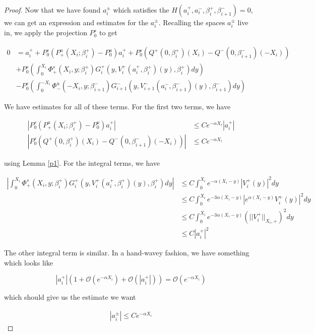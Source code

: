 \documentclass[thesis.tex]{subfiles}
\begin{document}
\begin{lemma}
\begin{proof}
Now that we have found $a_i^\pm$ which satisfies the $H(a_i^+, a_i^-, \beta_i^+, \beta_{i+1}^-) = 0$, we can get an expression and estimates for the $a_i^\pm$. Recalling the spaces $a_i^\pm$ live in, we apply the projection $P^s_0$ to get

\begin{align*}
0 &= a_i^+ + P^s_0(P^u_+(X_i; \beta_i^+) -  P^u_0)a_i^+ 
+ P^s_0 \left( Q^+(0, \beta_i^+)(X_i) - Q^-(0, \beta_{i+1}^-)(-X_i) \right)\\
&+ P^s_0 \left( \int_0^{X_i} \Phi_+^s(X_i, y; \beta_i^+) G_i^+(y, V_i^+(a_i^+, \beta_i^+)(y),\beta_i^+)dy \right) \\
&- P^s_0 \left( \int_0^{-X_i} \Phi_-^u(-X_i, y; \beta_{i+1}^-) G_{i+1}^-(y, V_{i+1}^-(a_i^-, \beta_{i+1}^-)(y),\beta_{i+1}^-) dy \right)
\end{align*}

We have estimates for all of these terms. For the first two terms, we have

\begin{align*}
|P^s_0(P^u_+(X_i; \beta_i^+) -  P^u_0)a_i^+ | &\leq C e^{-\alpha X_i} |a_i^+| \\
|P^s_0 \left( Q^+(0, \beta_i^+)(X_i) - Q^-(0, \beta_{i+1}^-)(-X_i) \right)| &\leq C e^{-\alpha X_i}
\end{align*}

using Lemma \ref{p1}. For the integral terms, we have

\begin{align*}
\left| \int_0^{X_i} \Phi_+^s(X_i, y; \beta_i^+) G_i^+(y, V_i^+(a_i^+, \beta_i^+)(y),\beta_i^+)dy \right| &\leq C \int_0^{X_i}e^{-\alpha(X_i - y)} |V_i^+(y)|^2 dy \\
&\leq C \int_0^{X_i}e^{-3 \alpha (X_i - y)} |e^{\alpha(X_i - y)} V_i^+(y)|^2 dy \\
&\leq C \int_0^{X_i}e^{-3 \alpha (X_i - y)} (||V_i^+||_{X_i, +})^2 dy \\
&\leq C |a_i^+|^2
\end{align*}

The other integral term is similar. In a hand-wavey fashion, we have something which looks like

\[
|a_i^+|(1 + \mathcal{O}(e^{-\alpha X_i}) + \mathcal{O}(|a_i^+|)) = 
\mathcal{O}( e^{-\alpha X_i} )
\]

which should give us the estimate we want

\begin{align*}
|a_i^\pm| \leq C e^{-\alpha X_i}
\end{align*}


\end{proof}
\end{lemma}
\end{document}
